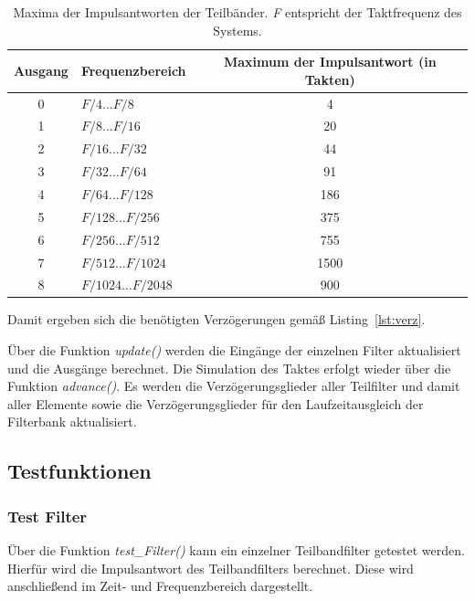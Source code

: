 \begin{table}[!htpb]
  \centering
  \begin{tabular}{c | l | c}
    \toprule
    Ausgang&Frequenzbereich&Maximum der Impulsantwort (in Takten)\\
    \midrule
    0&$F/4\ldots F/8$&4\\
    1&$F/8\ldots F/16$&20\\
    2&$F/16\ldots F/32$&44\\
    3&$F/32\ldots F/64$&91\\
    4&$F/64\ldots F/128$&186\\
    5&$F/128\ldots F/256$&375\\
    6&$F/256\ldots F/512$&755\\
    7&$F/512\ldots F/1024$&1500\\
    8&$F/1024\ldots F/2048$&900\\
    \bottomrule
  \end{tabular}
  \caption{Maxima der Impulsantworten der Teilbänder. \emph{F} entspricht der Taktfrequenz des Systems.}
  \label{tab:filt_max}
\end{table}
Damit ergeben sich die benötigten Verzögerungen gemäß Listing~\ref{lst:verz}.



Über die Funktion \emph{update()} werden die Eingänge der einzelnen Filter aktualisiert und die Ausgänge berechnet. Die Simulation des Taktes erfolgt wieder über die Funktion \emph{advance()}. Es werden die Verzögerungsglieder aller Teilfilter und damit aller Elemente sowie die Verzögerungsglieder für den Laufzeitausgleich der Filterbank aktualisiert.


\subsection{Testfunktionen}\label{sec:impl_test}

\subsubsection{Test Filter}\label{sec:impl_testFilter}
Über die Funktion \emph{test\_Filter()} kann ein einzelner Teilbandfilter getestet werden. Hierfür wird die Impulsantwort des Teilbandfilters berechnet. Diese wird anschließend im Zeit- und Frequenzbereich dargestellt.

